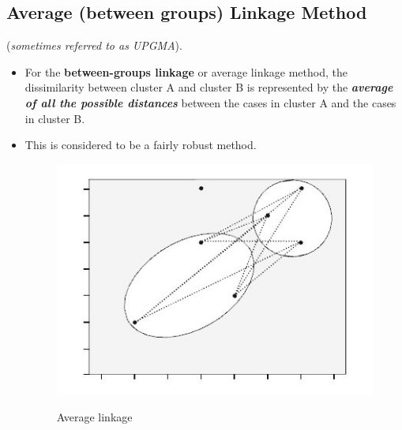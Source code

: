 \documentclass[a4paper,12pt]{article}
\begin{document}
\subsection{Average (between groups) Linkage Method }
(\textit{sometimes referred to as UPGMA}).\\
\begin{itemize}
\item For the \textbf{between-groups linkage} or average linkage method, the dissimilarity between cluster A and cluster B is represented by the \textbf{\textit{average of all the possible distances}} between the cases in cluster A and the cases in cluster B. 
\item This is considered to be a fairly robust method.
\begin{figure}[h!]
	\begin{center}
		\includegraphics[scale=0.4]{images/Link3.jpg}\\
		\caption{Average linkage}
	\end{center}
\end{figure}
\end{itemize}
\end{document}
